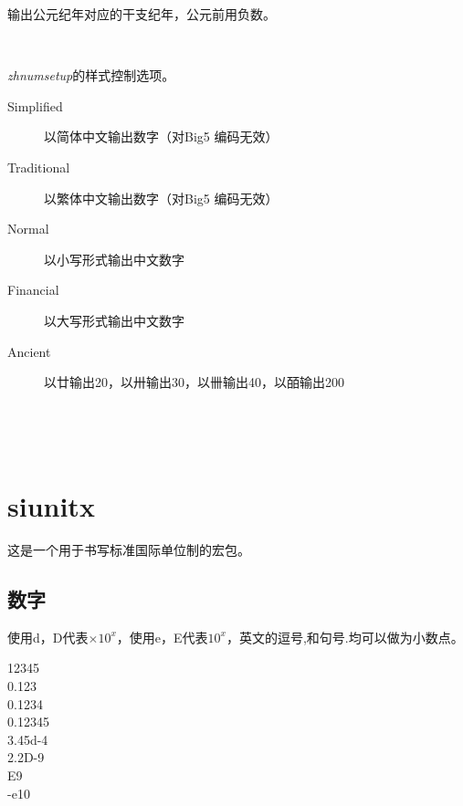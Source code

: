 输出公元纪年对应的干支纪年，公元前用负数。

\begin{codeshow}
 \\
\zhganzhinian{\year}
\end{codeshow}

\emph{zhnumsetup}的样式控制选项。

\begin{description}
    \item [Simplified] 以简体中文输出数字（对Big5 编码无效）
    \item [Traditional] 以繁体中文输出数字（对Big5 编码无效）
    \item [Normal] 以小写形式输出中文数字
    \item [Financial] 以大写形式输出中文数字
    \item [Ancient] 以廿输出20，以卅输出30，以卌输出40，以皕输出200
\end{description}

\begin{codeshow}
\\
\end{codeshow}

\begin{codeshow}
\\
\end{codeshow}


\section{siunitx}
这是一个用于书写标准国际单位制的宏包。

\subsection{数字}


使用d，D代表$\times10^{x}$，使用e，E代表$10^{x}$，英文的逗号,和句号.均可以做为小数点。

\begin{codeshow}
\num{12345} \\
\num{0.123} \\
\num{0,1234} \\
\num{.12345} \\
\num{3.45d-4} \\
\num{2.2D-9} \\
\num{E9} \\
\num{-e10}
\end{codeshow}


